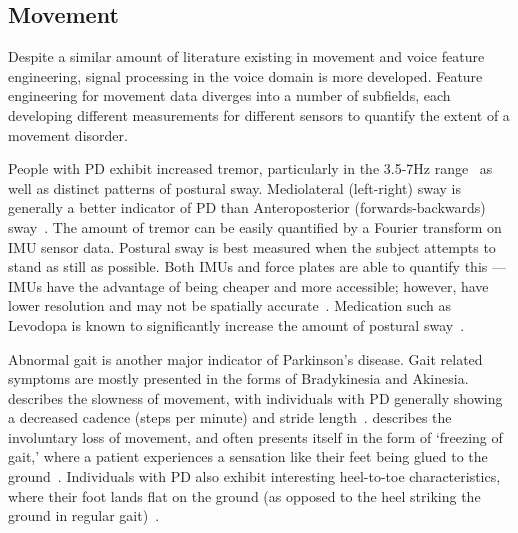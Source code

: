 \documentclass[12pt, twoside]{book}
\renewcommand\emph[1]{\textit{\color{USred}{#1}}}
\begin{document}
\subsection{Movement}\label{movementfeatures}
Despite a similar amount of literature existing in movement and voice feature engineering, signal processing in the voice domain is more developed. Feature engineering for movement data diverges into a number of subfields, each developing different measurements for different sensors to quantify the extent of a movement disorder. %

People with PD exhibit increased tremor, particularly in the 3.5-7Hz range~\cite{duval2004detection} as well as distinct patterns of postural sway. Mediolateral (left-right) sway is generally a better indicator of PD than Anteroposterior (forwards-backwards) sway~\cite{posturalswaylongitudinal}. The amount of tremor can be easily quantified by a Fourier transform on IMU sensor data. Postural sway is best measured when the subject attempts to stand as still as possible. Both IMUs and force plates are able to quantify this --- IMUs have the advantage of being cheaper and more accessible; however, have lower resolution and may not be spatially accurate~\cite{palmerini2011tremor}.  Medication such as Levodopa is known to significantly increase the amount of postural sway~\cite{posturalswaylongitudinal}.





 
Abnormal gait is another major indicator of Parkinson's disease. Gait related symptoms are mostly presented in the forms of Bradykinesia and Akinesia. \emph{Bradykinesia} describes the slowness of movement, with individuals with PD generally showing a decreased cadence (steps per minute) and stride length~\cite{esser2011assessment}. \emph{Akinesia} describes the involuntary loss of movement, and often presents itself in the form of `freezing of gait,' where a patient experiences a sensation like their feet being glued to the ground~\cite{giladi1992motor}. Individuals with PD also exhibit interesting heel-to-toe characteristics, where their foot lands flat on the ground (as opposed to the heel striking the ground in regular gait)~\cite{heeltotoe, roiz2010gait}.
\end{document}

